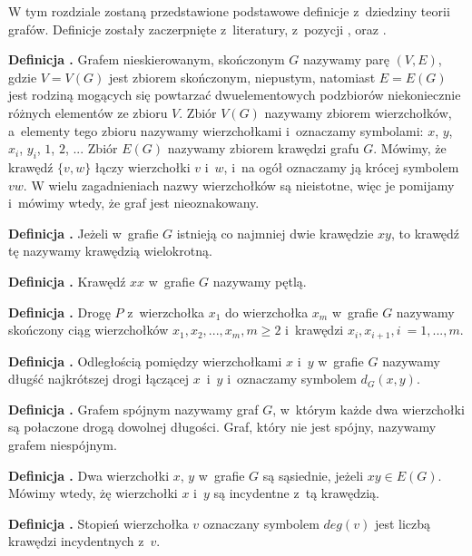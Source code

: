 W tym rozdziale zostaną przedstawione podstawowe definicje z~dziedziny teorii grafów.
Definicje zostały zaczerpnięte z~literatury, z~pozycji \cite{Wloch2008}, \cite{Wilson2012} oraz \cite{Wojciechwoski2013}.

\noindent
\textbf{Definicja .}
\incrementdefinitionIndex
Grafem nieskierowanym, skończonym $G$ nazywamy parę $(V,E)$, gdzie $V = V(G)$ jest zbiorem skończonym, niepustym,
natomiast $E = E(G)$ jest rodziną mogących się powtarzać dwuelementowych podzbiorów niekoniecznie różnych elementów ze zbioru $V$.
Zbiór $V(G)$ nazywamy zbiorem wierzchołków, a~elementy tego zbioru nazywamy wierzchołkami i~oznaczamy symbolami:
$x$, $y$, $x_i$, $y_i$, $1$, $2$, ... Zbiór $E(G)$ nazywamy zbiorem krawędzi grafu $G$.
Mówimy, że krawędź $\{v, w\}$ łączy wierzchołki $v$ i~$w$, i~na ogół oznaczamy ją krócej symbolem $vw$.
W wielu zagadnieniach nazwy wierzchołków są nieistotne, więc je pomijamy i~mówimy wtedy, że graf jest nieoznakowany.

\noindent
\textbf{Definicja .}
\incrementdefinitionIndex
Jeżeli w~grafie $G$ istnieją co najmniej dwie krawędzie $xy$, to krawędź tę nazywamy krawędzią wielokrotną.

\noindent
\textbf{Definicja .}
\incrementdefinitionIndex
Krawędź $xx$ w~grafie $G$ nazywamy pętlą.

\noindent
\textbf{Definicja .}
\incrementdefinitionIndex
Drogę $P$ z~wierzchołka $x_1$ do wierzchołka $x_m$ w~grafie $G$ nazywamy skończony ciąg wierzchołków
$x_1, x_2, ..., x_m, m \geqslant 2$ i~krawędzi ${x_i, x_{i + 1}}, i~= 1, ..., m$.

\noindent
\textbf{Definicja .}
\incrementdefinitionIndex
Odległością pomiędzy wierzchołkami $x$ i~$y$ w~grafie $G$ nazywamy długść najkrótszej drogi łączącej $x$~i~$y$
i~oznaczamy symbolem $d_G(x,y)$.

\noindent
\textbf{Definicja .}
\incrementdefinitionIndex
Grafem spójnym nazywamy graf $G$, w~którym każde dwa wierzchołki są połaczone drogą dowolnej długości.
Graf, który nie jest spójny, nazywamy grafem niespójnym.

\noindent
\textbf{Definicja .}
\incrementdefinitionIndex
Dwa wierzchołki $x$, $y$ w~grafie $G$ są sąsiednie, jeżeli $xy \in E(G)$.
Mówimy wtedy, żę wierzchołki $x$ i~$y$ są incydentne z~tą krawędzią.

\noindent
\textbf{Definicja .}
\incrementdefinitionIndex
Stopień wierzchołka $v$ oznaczany symbolem $deg(v)$ jest liczbą krawędzi incydentnych z~$v$.

